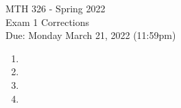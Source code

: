 \documentclass[12pt]{article}
\begin{document}
\pagestyle{fancy}
\fancyhf{}

\noindent MTH 326 - Spring 2022
\\Exam 1 Corrections
\\Due: Monday March 21, 2022 (11:59pm)

\begin{enumerate}
    \item 
    \vspace{.25in}
    \item 
    \item 
    \newpage
    \item 
    \end{enumerate}
\end{document}
